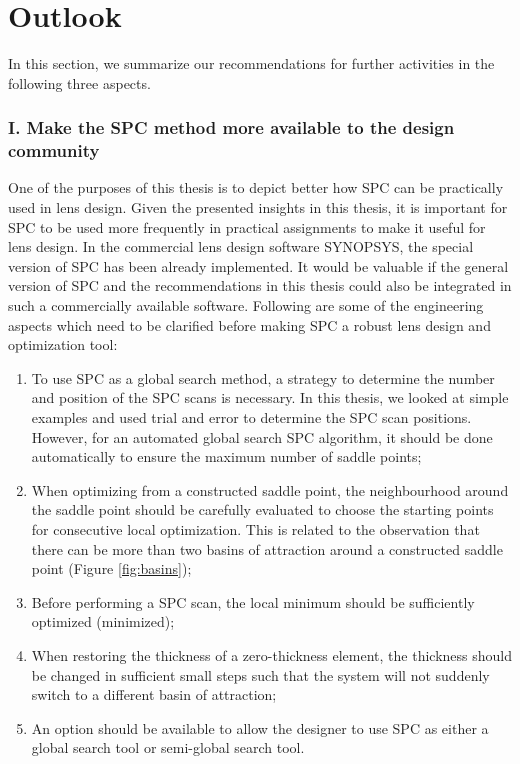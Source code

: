 \newpage

\section{Outlook}
In this section, we summarize our recommendations for further activities in the following three aspects.

\subsubsection{I. Make the SPC method more available to the design community}

One of the purposes of this thesis is to depict better how SPC can be practically used in lens design. Given the presented insights in this thesis, it is important for SPC to be used more frequently in practical assignments to make it useful for lens design. In the commercial lens design software SYNOPSYS\texttrademark \cite{SYNOPSYSSW}, the special version of SPC has been already implemented. It would be valuable if the general version of SPC and the recommendations in this thesis could also be integrated in such a commercially available software. Following are some of the engineering aspects which need to be clarified before making SPC a robust lens design and optimization tool:
\begin{enumerate}[nosep]
\item To use SPC as a global search method, a strategy to determine the number and position of the SPC scans is necessary. In this thesis, we looked at simple examples and used trial and error to determine the SPC scan positions. However, for an automated global search SPC algorithm, it should be done automatically to ensure the maximum number of saddle points;
\item When optimizing from a constructed saddle point, the neighbourhood around the saddle point should be carefully evaluated to choose the starting points for consecutive local optimization. This is related to the observation that there can be more than two basins of attraction around a constructed saddle point (Figure \ref{fig:basins});
\item Before performing a SPC scan, the local minimum should be sufficiently optimized (minimized); 
\item When restoring the thickness of a zero-thickness element, the thickness should be changed in sufficient small steps such that the system will not suddenly switch to a different basin of attraction; 
\item  An option should be available to allow the designer to use SPC as either a global search tool or semi-global search tool. 
\end{enumerate}


